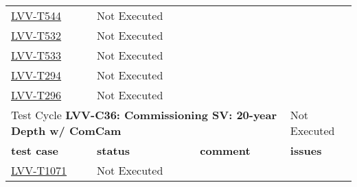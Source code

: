 \documentclass[DM,lsstdraft,STR,toc]{lsstdoc}
\begin{document}
\begin{longtable}{p{2cm}p{2.5cm}p{9cm}p{2.5cm}}
\begin{minipage}[]{9cm}
    \medskip
    \end{minipage}
    &
    \\\hline
\href{https://jira.lsstcorp.org/secure/Tests.jspa#/testCase/LVV-T544}{LVV-T544}
    & Not Executed &
    \begin{minipage}[]{9cm}
    \smallskip
    
    \medskip
    \end{minipage}
    &
    \\\hline
\href{https://jira.lsstcorp.org/secure/Tests.jspa#/testCase/LVV-T532}{LVV-T532}
    & Not Executed &
    \begin{minipage}[]{9cm}
    \smallskip
    
    \medskip
    \end{minipage}
    &
    \\\hline
\href{https://jira.lsstcorp.org/secure/Tests.jspa#/testCase/LVV-T533}{LVV-T533}
    & Not Executed &
    \begin{minipage}[]{9cm}
    \smallskip
    
    \medskip
    \end{minipage}
    &
    \\\hline
\href{https://jira.lsstcorp.org/secure/Tests.jspa#/testCase/LVV-T294}{LVV-T294}
    & Not Executed &
    \begin{minipage}[]{9cm}
    \smallskip
    
    \medskip
    \end{minipage}
    &
    \\\hline
\href{https://jira.lsstcorp.org/secure/Tests.jspa#/testCase/LVV-T296}{LVV-T296}
    & Not Executed &
    \begin{minipage}[]{9cm}
    \smallskip
    
    \medskip
    \end{minipage}
    &
    \\\hline

  \multicolumn{3}{l}{ Test Cycle {\bf LVV-C36: Commissioning SV: 20-year Depth w/ ComCam
 }} & Not Executed \\\hline

  {\bf \footnotesize test case} & {\bf \footnotesize status} & {\bf \footnotesize comment} & {\bf \footnotesize issues} \\\toprule

\href{https://jira.lsstcorp.org/secure/Tests.jspa#/testCase/LVV-T1071}{LVV-T1071}
    & Not Executed &
    \begin{minipage}[]{9cm}
    \smallskip
    

\end{minipage}
\end{longtable}
\end{document}
